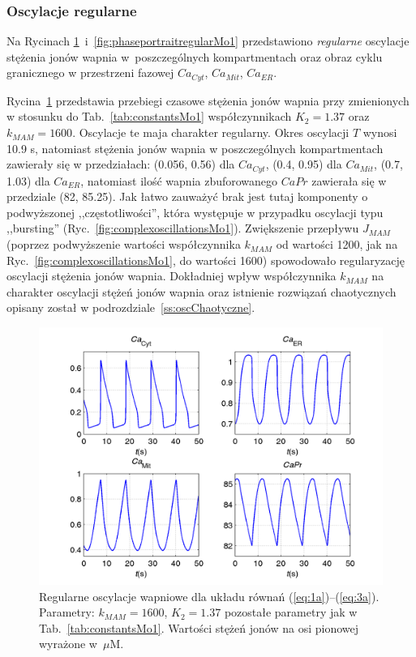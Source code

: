 \FloatBarrier
\subsubsection*{Oscylacje regularne}

Na Rycinach \ref{fig:regularoscillationsMo1}~i~\ref{fig:phaseportraitregularMo1} przedstawiono \emph{regularne} oscylacje stężenia jonów wapnia w~poszczególnych  kompartmentach oraz obraz cyklu granicznego w przestrzeni fazowej $Ca_{Cyt}$, $Ca_{Mit}$, $Ca_{ER}$.

 

Rycina~\ref{fig:regularoscillationsMo1} przedstawia przebiegi czasowe stężenia jonów wapnia przy zmienionych w stosunku do Tab.~\ref{tab:constantsMo1} współczynnikach $K_2=1.37$ oraz $k_{MAM}=1600$. Oscylacje te maja charakter regularny. Okres oscylacji $T$ wynosi 10.9 s, natomiast stężenia jonów wapnia  w poszczególnych kompartmentach zawierały się w przedziałach: (0.056, 0.56) dla $Ca_{Cyt}$, (0.4, 0.95) dla $Ca_{Mit}$, (0.7, 1.03) dla $Ca_{ER}$, natomiast ilość wapnia zbuforowanego $CaPr$ zawierała się w przedziale (82, 85.25). Jak łatwo zauważyć brak jest tutaj komponenty o podwyższonej ,,częstotliwości'', która występuje w przypadku oscylacji typu ,,bursting'' (Ryc.~\ref{fig:complexoscillationsMo1}). Zwiększenie  przepływu $J_{MAM}$ (poprzez podwyższenie wartości współczynnika $k_{MAM}$ od wartości 1200, jak na Ryc.~\ref{fig:complexoscillationsMo1}, do wartości 1600) spowodowało regularyzację oscylacji stężenia jonów wapnia. Dokładniej wpływ współczynnika $k_{MAM}$ na charakter oscylacji stężeń jonów wapnia oraz istnienie rozwiązań chaotycznych opisany został w podrozdziale~\ref{ss:oscChaotyczne}.

\begin{figure}[ht]
	\centering
	\includegraphics[width=1\textwidth]{rysunki/rozdzial_5/regular_timecourseMo1}
	\caption[Regularne oscylacje wapniowe w Modelu \#1]{Regularne oscylacje wapniowe dla układu równań (\ref{eq:1a})--(\ref{eq:3a}). Parametry: $k_{MAM} = 1600$, $K_{2} = 1.37$ pozostałe parametry jak w Tab.~\ref{tab:constantsMo1}. Wartości stężeń jonów  na  osi pionowej wyrażone w~$\mu$M.}
	\label{fig:regularoscillationsMo1}
\end{figure}


